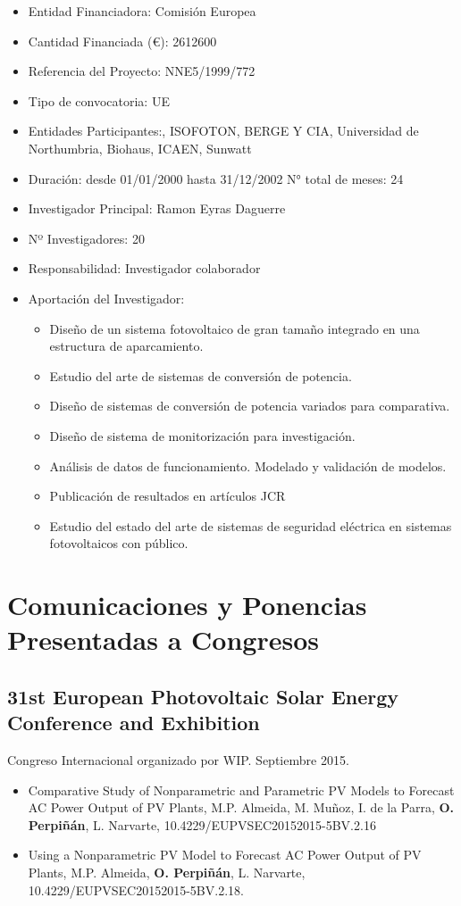 \documentclass[article, a4paper]{memoir}
\begin{document}
\begin{itemize}
\item Entidad Financiadora: Comisión Europea
\item Cantidad Financiada (€): 2612600
\item Referencia del Proyecto: NNE5/1999/772
\item Tipo de convocatoria: UE
\item Entidades Participantes:, ISOFOTON, BERGE Y CIA, Universidad de Northumbria, Biohaus, ICAEN, Sunwatt
\item Duración: desde 01/01/2000 hasta 31/12/2002 N° total de meses: 24
\item Investigador Principal: Ramon Eyras Daguerre
\item Nº Investigadores: 20
\item Responsabilidad: Investigador colaborador
\item Aportación del Investigador:
\begin{itemize}
\item Diseño de un sistema fotovoltaico de gran tamaño integrado en una estructura de aparcamiento.
\item Estudio del arte de sistemas de conversión de potencia.
\item Diseño de sistemas de conversión de potencia variados para comparativa.
\item Diseño de sistema de monitorización para investigación.
\item Análisis de datos de funcionamiento. Modelado y validación de modelos.
\item Publicación de resultados en artículos JCR
\item Estudio del estado del arte de sistemas de seguridad eléctrica en sistemas fotovoltaicos con público.
\end{itemize}
\end{itemize}


\section{Comunicaciones y Ponencias Presentadas a Congresos}
\label{sec:org30fec23}
\subsection{31st European Photovoltaic Solar Energy Conference and Exhibition}
\label{sec:orgbf7af69}
Congreso Internacional organizado por WIP. Septiembre 2015.

\begin{itemize}
\item Comparative Study of Nonparametric and Parametric PV Models to Forecast AC Power Output of PV Plants, M.P. Almeida, M. Muñoz, I. de la Parra, \textbf{O. Perpiñán}, L. Narvarte, 10.4229/EUPVSEC20152015-5BV.2.16

\item Using a Nonparametric PV Model to Forecast AC Power Output of PV Plants, M.P. Almeida, \textbf{O. Perpiñán}, L. Narvarte, 10.4229/EUPVSEC20152015-5BV.2.18.
\end{itemize}
\end{document}
